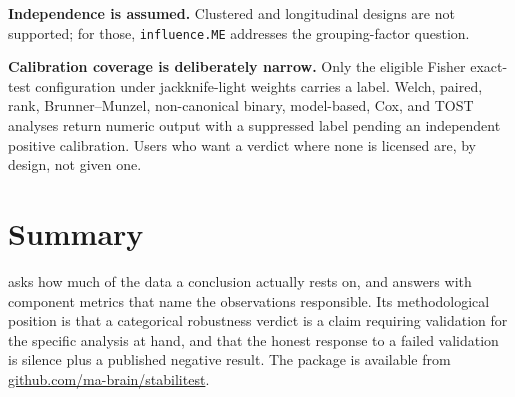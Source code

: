 \textbf{Independence is assumed.} Clustered and longitudinal designs are not
supported; for those, \texttt{influence.ME} addresses the grouping-factor question.

\textbf{Calibration coverage is deliberately narrow.} Only the eligible Fisher
exact-test configuration under jackknife-light weights carries a label.
Welch, paired, rank, Brunner--Munzel, non-canonical binary, model-based, Cox,
and TOST analyses return numeric output with a suppressed label pending an
independent positive calibration. Users who want a verdict where none is
licensed are, by design, not given one.

\section{Summary}\label{summary}

 asks how much of the data a conclusion actually rests on,
and answers with component metrics that name the observations responsible. Its
methodological position is that a categorical robustness verdict is a claim
requiring validation for the specific analysis at hand, and that the honest
response to a failed validation is silence plus a published negative result.
The package is available from
\href{https://github.com/ma-brain/stabilitest}{github.com/ma-brain/stabilitest}.



\address{%
Marius Ardelean\\
Independent researcher\\%
\\
%
\url{https://github.com/ma-brain/stabilitest}\\%
%
\href{mailto:marally@gmail.com}{\nolinkurl{marally@gmail.com}}%
}
